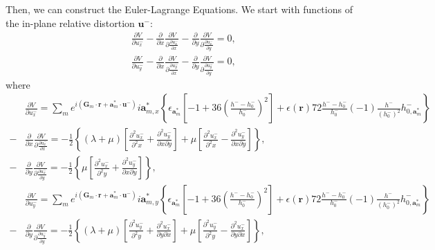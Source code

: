 \documentclass[aps,prx,10pt,twocolumn,superscriptaddress]{revtex4}
\begin{document}
\begin{widetext}
Then, we can construct the Euler-Lagrange Equations. We start with functions of the in-plane relative distortion $\textbf{u}^{-}$:
\begin{align}\label{eq:elum}
&\frac{\partial V}{\partial u^{-}_{x}}-\frac{\partial }{\partial x}\frac{\partial V}{\partial \frac{\partial u^{-}_{x}}{\partial x}}-\frac{\partial }{\partial y}\frac{\partial V}{\partial \frac{\partial u^{-}_{x}}{\partial y}}=0,\nonumber\\
&\frac{\partial V}{\partial u^{-}_{y}}-\frac{\partial }{\partial x}\frac{\partial V}{\partial \frac{\partial u^{-}_{y}}{\partial x}}-\frac{\partial }{\partial y}\frac{\partial V}{\partial \frac{\partial u^{-}_{y}}{\partial y}}=0,
\end{align}
where
\begin{equation}
\begin{split}
&\frac{\partial V}{\partial u^{-}_{x}}=\sum_{m}e^{i(\textbf{G}_{m}\cdot\textbf{r}+\textbf{a}^{*}_{m}\cdot\textbf{u}^{-})}i\textbf{a}^{*}_{m,x}\left\{\epsilon_{\textbf{a}^{*}_{m}}\left[-1+36\left(\frac{h^{-}-h^{-}_{0}}{h^{-}_{0}}\right)^{2}\right]+\epsilon(\textbf{r})72\frac{h^{-}-h^{-}_{0}}{h^{-}_{0}}(-1)\frac{h^{-}}{(h^{-}_{0})^{2}}h^{-}_{0,\textbf{a}^{*}_{m}}\right\}\\
-&\frac{\partial }{\partial x}\frac{\partial V}{\partial \frac{\partial u^{-}_{x}}{\partial x}}=-\frac{1}{2}\left\{ (\lambda+\mu)\left[ \frac{\partial^{2}u^{-}_{x}}{\partial^{2}x}+\frac{\partial^{2}u^{-}_{y}}{\partial x \partial y} \right]+ \mu\left[  \frac{\partial^{2}u^{-}_{x}}{\partial^{2}x}-\frac{\partial^{2}u^{-}_{y}}{\partial x \partial y} \right] \right\},\\
-&\frac{\partial }{\partial y}\frac{\partial V}{\partial \frac{\partial u^{-}_{x}}{\partial y}}=-\frac{1}{2}\left\{\mu\left[\frac{\partial^{2}u^{-}_{x}}{\partial^{2}y}+\frac{\partial^{2}u^{-}_{y}}{\partial x \partial y} \right]\right\},\\
&\frac{\partial V}{\partial u^{-}_{y}}=\sum_{m}e^{i(\textbf{G}_{m}\cdot\textbf{r}+\textbf{a}^{*}_{m}\cdot\textbf{u}^{-})}i\textbf{a}^{*}_{m,y}\left\{\epsilon_{\textbf{a}^{*}_{m}}\left[-1+36\left(\frac{h^{-}-h^{-}_{0}}{h^{-}_{0}}\right)^{2}\right]+\epsilon(\textbf{r})72\frac{h^{-}-h^{-}_{0}}{h^{-}_{0}}(-1)\frac{h^{-}}{(h^{-}_{0})^{2}}h^{-}_{0,\textbf{a}^{*}_{m}}\right\}\\
-&\frac{\partial }{\partial y}\frac{\partial V}{\partial \frac{\partial u^{-}_{y}}{\partial y}}=-\frac{1}{2}\left\{ (\lambda+\mu)\left[ \frac{\partial^{2}u^{-}_{y}}{\partial^{2}y}+\frac{\partial^{2}u^{-}_{x}}{\partial y \partial x} \right]+ \mu\left[  \frac{\partial^{2}u^{-}_{y}}{\partial^{2}y}-\frac{\partial^{2}u^{-}_{x}}{\partial y \partial x} \right] \right\},\\

\end{split}
\end{equation}
\end{widetext}
\end{document}
